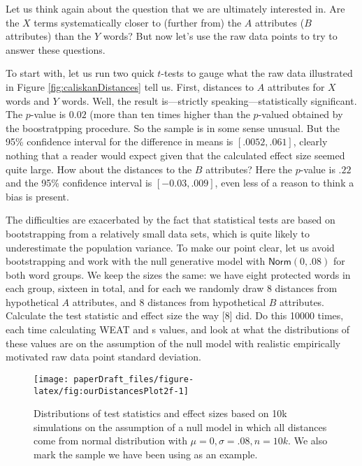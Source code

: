 \documentclass[
  12pt,
  dvipsnames,enabledeprecatedfontcommands]{scrartcl}
\begin{document}
Let us think again about the question that we are ultimately interested
in. Are the \(X\) terms systematically closer to (further from) the
\(A\) attributes (\(B\) attributes) than the \(Y\) words? But now let's
use the raw data points to try to answer these questions.

To start with, let us run two quick \(t\)-tests to gauge what the raw
data illustrated in Figure \ref{fig:caliskanDistances} tell us. First,
distances to \(A\) attributes for \(X\) words and \(Y\) words. Well, the
result is---strictly speaking---statistically significant. The
\(p\)-value is \(0.02\) (more than ten times higher than the
\(p\)-valued obtained by the boostratpping procedure. So the sample is
in some sense unusual. But the 95\% confidence interval for the
difference in means is \([.0052, .061]\), clearly nothing that a reader
would expect given that the calculated effect size seemed quite large.
How about the distances to the \(B\) attributes? Here the \(p\)-value is
\(.22\) and the 95\% confidence interval is \([-0.03, .009]\), even less
of a reason to think a bias is present.

The difficulties are exacerbated by the fact that statistical tests are
based on bootstrapping from a relatively small data sets, which is quite
likely to underestimate the population variance. To make our point
clear, let us avoid bootstrapping and work with the null generative
model with \(\mathsf{Norm}(0,.08)\) for both word groups. We keep the
sizes the same: we have eight protected words in each group, sixteen in
total, and for each we randomly draw 8 distances from hypothetical \(A\)
attributes, and \(8\) distances from hypothetical \(B\) attributes.
Calculate the test statistic and effect size the way {[}8{]} did. Do
this 10000 times, each time calculating \textsf{WEAT} and \textsf{s}
values, and look at what the distributions of these values are on the
assumption of the null model with realistic empirically motivated raw
data point standard deviation.

\begin{figure}[H]

\begin{center}\texttt{[image: paperDraft\_files/figure-latex/fig:ourDistancesPlot2f-1]} \end{center}

\caption{Distributions of test statistics and effect sizes based on 10k simulations on the assumption of a null model in which all distances come from normal distribution with $\mu =0, \sigma = .08, n=10k$. We also mark the sample we have been using as an example.}
\label{fig:ourDistances}
\end{figure}
\end{document}
